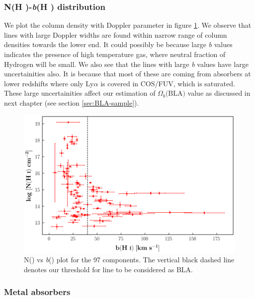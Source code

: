 \subsubsection*{N(H \hspace*{-0.6mm}{\footnotesize I})-\emph{b}(H \hspace*{-0.6mm}{\footnotesize I}) distribution} 

We plot the  column density with Doppler parameter in figure \ref{fig:NHi_bHi}. We observe that lines with large Doppler widths are found within narrow range of column densities towards the lower end. It could possibly be because large \emph{b} values indicates the presence of high temperature gas, where neutral fraction of Hydrogen will be small. We also see that the lines with large \emph{b} values have large uncertainities also. It is because that most of these are coming from absorbers at lower redshifts where only Ly$\alpha$ is covered in COS/FUV, which is saturated. These large uncertainities affect our estimation of $\Omega_b\text{(BLA)}$ value as discussed in next chapter (see section \ref{sec:BLA-sample}). 

\begin{figure}
    \centering
    \includegraphics[width=\linewidth]{Figures/NHi_vs_bHi.png}
    \caption{N() vs \emph{b}() plot for the 97  components. The vertical black dashed line denotes our threshold for line to be considered as BLA.}
    \label{fig:NHi_bHi}
\end{figure}

\subsubsection{Metal absorbers}

